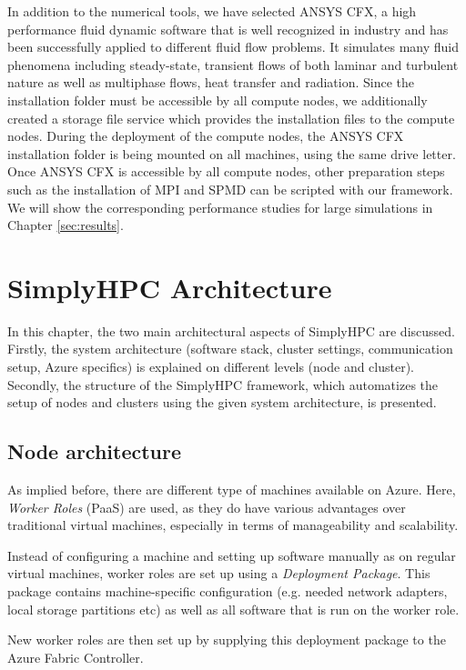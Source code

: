 \documentclass[3p,times]{elsarticle}
\begin{document}
In addition to the numerical tools, we have selected ANSYS CFX, a high performance fluid dynamic software that is well recognized in industry and has been successfully applied to different fluid flow problems. It simulates many fluid phenomena including steady-state, transient flows of both laminar and turbulent nature as well as multiphase flows, heat transfer and radiation. Since the installation folder must be accessible by all compute nodes, we additionally created a storage file service which provides the installation files to the compute nodes. During the deployment of the compute nodes, the ANSYS CFX installation folder is being mounted on all machines, using the same drive letter. Once ANSYS CFX is accessible by all compute nodes, other preparation steps such as the installation of MPI and SPMD can be scripted with our framework. We will show the corresponding performance studies for large simulations in Chapter \ref{sec:results}.

\section{SimplyHPC Architecture}
\label{sec:architecture}
In this chapter, the two main architectural aspects of SimplyHPC are discussed. Firstly, the system architecture (software stack, cluster settings, communication setup, Azure specifics) is explained on different levels (node and cluster). Secondly, the structure of the SimplyHPC framework, which automatizes the setup of nodes and clusters using the given system architecture, is presented.




\subsection{Node architecture}

As implied before, there are different type of machines available on Azure. Here, \textit{Worker Roles} (PaaS) are used, as they do have various advantages over traditional virtual machines, especially in terms of manageability and scalability. 


Instead of configuring a machine and setting up software manually as on regular virtual machines, worker roles are set up using a \textit{Deployment Package}. This package contains machine-specific configuration (e.g. needed network adapters, local storage partitions etc) as well as all software that is run on the worker role. 


New worker roles are then set up by supplying this deployment package to the Azure Fabric Controller.
\end{document}
